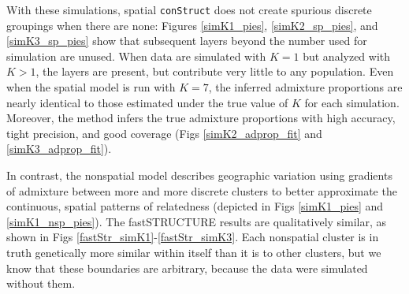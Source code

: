 \documentclass[10pt,letterpaper]{article}
\begin{document}
% 
% 

With these simulations,
spatial \texttt{conStruct} does not create spurious discrete groupings when there are none:
Figures \ref{simK1_pies}, \ref{simK2_sp_pies}, and \ref{simK3_sp_pies} 
show that subsequent layers beyond the number used for simulation are unused.
When data are simulated with $K=1$ but analyzed with $K>1$, 
the layers are present, but contribute very little to any population.
Even when the spatial model is run with $K=7$, 
the inferred admixture proportions are nearly identical to 
those estimated under the true value of $K$ for each simulation.
Moreover, the method infers the true admixture proportions with high accuracy, tight precision, and good coverage 
(Figs \ref{simK2_adprop_fit} and \ref{simK3_adprop_fit}).

In contrast, the nonspatial model describes geographic variation
using gradients of admixture between more and more discrete clusters
to better approximate the continuous, spatial patterns of relatedness
(depicted in Figs \ref{simK1_pies} and \ref{simK1_nsp_pies}).
The fastSTRUCTURE results are qualitatively similar, as shown in Figs \ref{fastStr_simK1}-\ref{fastStr_simK3}.
Each nonspatial cluster is in truth genetically more similar within itself
than it is to other clusters,
but we know that these boundaries are arbitrary,
because the data were simulated without them.
\end{document}
